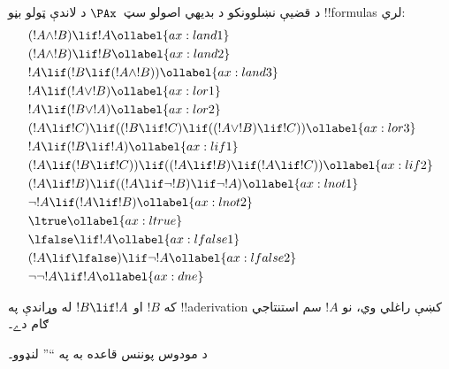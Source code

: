 \documentclass[../../../include/open-logic-section]{subfiles}
\begin{document}
      {}
      {}


\begin{defn}
د قضيې نښلوونکو د بديهي اصولو سټ~$\PAx$ د لاندې ټولو بڼو
!!{formula}s لري:
\begin{align}
  & (!A \land !B) \lif !A \ollabel{ax:land1}\\
  & (!A \land !B) \lif !B \ollabel{ax:land2}\\
  & !A \lif (!B \lif (!A \land !B)) \ollabel{ax:land3}\\
  & !A \lif (!A \lor !B) \ollabel{ax:lor1}\\
  & !A \lif (!B \lor !A) \ollabel{ax:lor2}\\
  & (!A \lif !C) \lif ((!B \lif !C) \lif ((!A \lor !B) \lif !C)) \ollabel{ax:lor3}\\
  & !A \lif (!B \lif !A) \ollabel{ax:lif1}\\
  & (!A \lif (!B \lif !C)) \lif ((!A \lif !B) \lif (!A \lif !C)) \ollabel{ax:lif2}\\
  & (!A \lif !B) \lif ((!A \lif \lnot !B) \lif \lnot !A) \ollabel{ax:lnot1}\\
  & \lnot !A \lif (!A \lif !B) \ollabel{ax:lnot2}\\
  & \ltrue \ollabel{ax:ltrue}\\
  & \lfalse \lif !A \ollabel{ax:lfalse1}\\
  & (!A \lif \lfalse) \lif \lnot !A \ollabel{ax:lfalse2}\\
  & \lnot\lnot !A \lif !A \ollabel{ax:dne}
\end{align}
\end{defn}

\begin{defn}
  که $!B$ او $!B \lif !A$ له وړاندې په !!a{derivation} کښې راغلي
  وي، نو $!A$ سم استنتاجي ګام دے۔
\end{defn}

د مودوس پوننس قاعده به په ``\MP'' لنډوو۔
\end{document}
